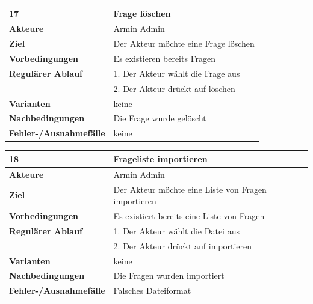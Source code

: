 \documentclass[fontsize=12pt,paper=a4,twoside]{scrartcl}
\begin{document}
\begin{table}
	[H] \label{17} 
	\begin{tabular}
		{|l|p{10cm}|} \hline \textbf{17} & \textbf{Frage löschen} \\
		\hline \textbf{Akteure} & Armin Admin\\
		\hline \textbf{Ziel} & Der Akteur möchte eine Frage löschen\\
		\hline \textbf{Vorbedingungen} & Es existieren bereits Fragen\\
		\hline \textbf{Regulärer Ablauf} & 1. Der Akteur wählt die Frage aus\\
		&2. Der Akteur drückt auf löschen\\
		\hline \textbf{Varianten} & keine \\
		\hline \textbf{Nachbedingungen} & Die Frage wurde gelöscht\\
		\hline \textbf{Fehler-/Ausnahmefälle} & keine\\
		\hline 
	\end{tabular}
\end{table}

\begin{table}
	[H] \label{18} 
	\begin{tabular}
		{|l|p{10cm}|} \hline \textbf{18} & \textbf{Frageliste importieren} \\
		\hline \textbf{Akteure} & Armin Admin\\
		\hline \textbf{Ziel} & Der Akteur möchte eine Liste von Fragen importieren\\
		\hline \textbf{Vorbedingungen} & Es existiert bereits eine Liste von Fragen\\
		\hline \textbf{Regulärer Ablauf} & 1. Der Akteur wählt die Datei aus\\
		&2. Der Akteur drückt auf importieren\\
		\hline \textbf{Varianten} & keine \\
		\hline \textbf{Nachbedingungen} & Die Fragen wurden importiert\\
		\hline \textbf{Fehler-/Ausnahmefälle} & Falsches Dateiformat\\
		\hline 
	\end{tabular}
\end{table}
\end{document}
